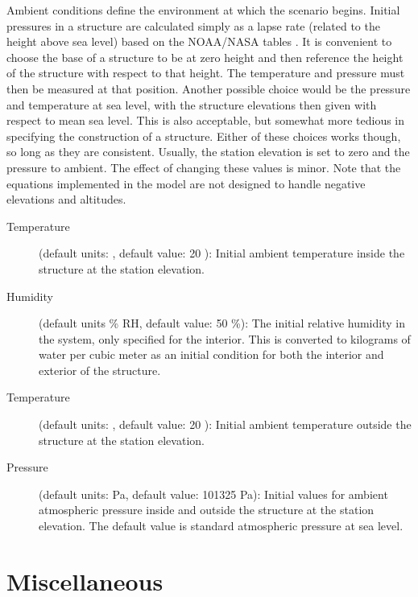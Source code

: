 Ambient conditions define the environment at which the scenario begins. Initial pressures in a structure are calculated simply as a lapse rate (related to the height above sea level) based on the NOAA/NASA tables \cite{GPO:Atmosphere}. It is convenient to choose the base of a structure to be at zero height and then reference the height of the structure with respect to that height.  The temperature and pressure must then be measured at that position.  Another possible choice would be the pressure and temperature at sea level, with the structure elevations then given with respect to mean sea level.  This is also acceptable, but somewhat more tedious in specifying the construction of a structure.  Either of these choices works though, so long as they are consistent. Usually, the station elevation is set to zero and the pressure to ambient. The effect of changing these values is minor. Note that the equations implemented in the model are not designed to handle negative elevations and altitudes.

\begin{description}
\item[Temperature] (default units: \degc, default value: 20 \degc): Initial ambient temperature inside the structure at the station elevation.

\item[Humidity] (default units \% RH, default value: 50 \%): The initial relative humidity in the system, only specified for the interior.  This is converted to kilograms of water per cubic meter as an initial condition for both the interior and exterior of the structure.

\item[Temperature] (default units: \degc, default value: 20 \degc): Initial ambient temperature outside the structure at the station elevation.

\item[Pressure] (default units: Pa, default value: 101325 Pa): Initial values for ambient atmospheric pressure inside and outside the structure at the station elevation. The default value is standard atmospheric pressure at sea level.
\end{description}


\section{Miscellaneous}
\label{info:MISC}

